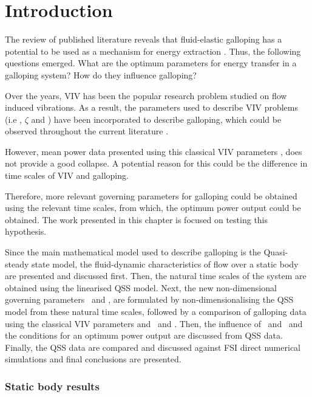\chapter{Introduction}

The review of published literature reveals that fluid-elastic galloping has a potential to be used as a mechanism for energy extraction \citep{Barrero-Gil2010a}. Thus, the following questions emerged. What are the optimum parameters for energy transfer in a galloping system? How do they influence galloping?

Over the years, VIV has been the popular research problem  studied on flow induced vibrations. As a result, the parameters used to describe VIV problems (i.e \mstar, $\zeta$ and \ustar) have been incorporated to describe galloping, which could be observed throughout the current literature \citep{Barrero-Gil2009,Barrero-Gil2010a,Parkinson1964}.

However, mean power data presented using this classical VIV parameters \citep{Barrero-Gil2010a}, does not provide a good collapse. A potential reason for this could be the difference in time scales of VIV and galloping.

Therefore, more relevant governing parameters for galloping could be obtained using the relevant time scales, from which, the optimum power output could be obtained. The work presented in this chapter is focused on testing this hypothesis. 

Since the main mathematical model used to describe galloping is the Quasi-steady state model, the fluid-dynamic characteristics of flow over a static body are presented and discussed first. Then, the natural time scales of the system are obtained using the linearised QSS model. Next, the new non-dimensional governing parameters  \massstiff\ and \massdamp, are formulated by non-dimensionalising the QSS model from these natural time scales, followed by a comparison of galloping data using the classical VIV parameters and  \massstiff\ and \massdamp. Then, the influence of \massstiff \ and \massdamp \ and the conditions for an optimum power output are discussed from QSS data. Finally, the QSS data are compared and discussed against FSI direct numerical simulations and final conclusions are presented.

\clearpage

\subsection{Static body results}

